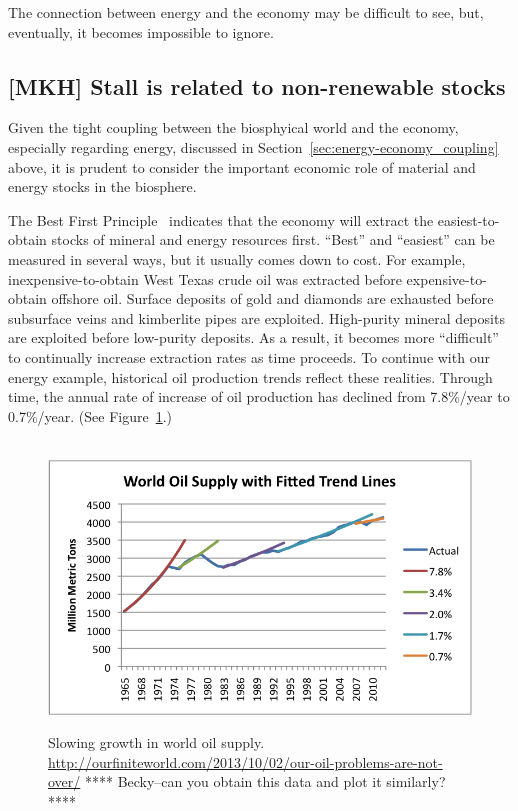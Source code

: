 The connection between energy and the economy may be difficult to see, 
but, eventually, it becomes impossible to ignore.


\subsection{[MKH] Stall is related to non-renewable stocks}
\label{sec:stall_non-renewable_stocks}

Given the tight coupling between the biosphyical world and the economy,
especially regarding energy,
discussed in Section~\ref{sec:energy-economy_coupling} above,
it is prudent to consider the important economic role of
material and energy stocks in the biosphere.

The Best First Principle~\cite{Cleveland:2008aa}
indicates that the economy will extract the easiest-to-obtain 
stocks of mineral and energy resources first.
``Best'' and ``easiest'' can be measured in several ways, 
but it usually comes down to cost.
For example, inexpensive-to-obtain West Texas crude oil was extracted
before expensive-to-obtain offshore oil. 
Surface deposits of gold and diamonds are exhausted before subsurface
veins and kimberlite pipes are exploited.
High-purity mineral deposits are exploited before low-purity deposits.
As a result, it becomes more ``difficult'' to continually increase
extraction rates as time proceeds.
To continue with our energy example,
historical oil production trends reflect these realities.
Through time, the annual rate of increase of oil production
has declined from 7.8\%/year to 0.7\%/year.
(See Figure~\ref{fig:oil_production}.)

\begin{figure}[!ht]
\centering\
\includegraphics[width=\linewidth]{Part_0/Chapter_Introduction/images/growth-in-world-oil-supply.png}
\caption[World Oil Supply]{Slowing growth in world oil supply.
\url{http://ourfiniteworld.com/2013/10/02/our-oil-problems-are-not-over/}
**** Becky--can you obtain this data and plot it similarly? ****
}
\label{fig:oil_production}
\end{figure}

